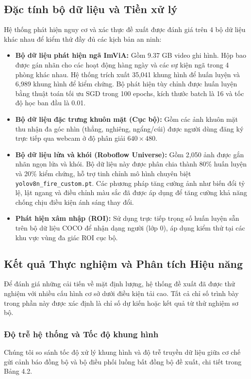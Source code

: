\documentclass[12pt,a4paper]{article}
\begin{document}
\subsection{Đặc tính bộ dữ liệu và Tiền xử lý}
Hệ thống phát hiện nguy cơ và xác thực đề xuất được đánh giá trên 4 bộ dữ liệu khác nhau để kiểm thử đầy đủ các kịch bản an ninh:
\begin{itemize}
    \item \textbf{Bộ dữ liệu phát hiện ngã ImViA:} Gồm 9.37 GB video ghi hình. Hộp bao được gán nhãn cho các hoạt động hàng ngày và các sự kiện ngã trong 4 phòng khác nhau. Hệ thống trích xuất 35,041 khung hình để huấn luyện và 6,989 khung hình để kiểm chứng. Bộ phát hiện tùy chỉnh được huấn luyện bằng thuật toán tối ưu SGD trong 100 epochs, kích thước batch là 16 và tốc độ học ban đầu là 0.01.
    \item \textbf{Bộ dữ liệu đặc trưng khuôn mặt (Cục bộ):} Gồm các ảnh khuôn mặt thu nhận đa góc nhìn (thẳng, nghiêng, ngẩng/cúi) được người dùng đăng ký trực tiếp qua webcam ở độ phân giải $640 \times 480$.
    \item \textbf{Bộ dữ liệu lửa và khói (Roboflow Universe):} Gồm 2,050 ảnh được gắn nhãn ngọn lửa và khói. Bộ dữ liệu này được phân chia thành 80\% huấn luyện và 20\% kiểm chứng, hỗ trợ tinh chỉnh mô hình chuyên biệt \texttt{yolov8n\_fire\_custom.pt}. Các phương pháp tăng cường ảnh như biến đổi tỷ lệ, lật ngang và điều chỉnh màu sắc đã được áp dụng để tăng cường khả năng chống chịu điều kiện ánh sáng thay đổi.
    \item \textbf{Phát hiện xâm nhập (ROI):} Sử dụng trực tiếp trọng số huấn luyện sẵn trên bộ dữ liệu COCO để nhận dạng người (lớp 0), áp dụng kiểm thử tại các khu vực vùng đa giác ROI cục bộ.
\end{itemize}

\subsection{Kết quả Thực nghiệm và Phân tích Hiệu năng}
Để đánh giá những cải tiến về mặt định lượng, hệ thống đề xuất đã được thử nghiệm với nhiều cấu hình cơ sở dưới điều kiện tải cao. Tất cả chỉ số trình bày trong phần này được xác định là chỉ số dự kiến hoặc kết quả từ thử nghiệm sơ bộ.

\subsubsection{Độ trễ hệ thống và Tốc độ khung hình}
Chúng tôi so sánh tốc độ xử lý khung hình và độ trễ truyền dữ liệu giữa cơ chế gửi cảnh báo đồng bộ và bộ điều phối luồng bất đồng bộ đề xuất, chi tiết trong Bảng 4.2.
\end{document}
